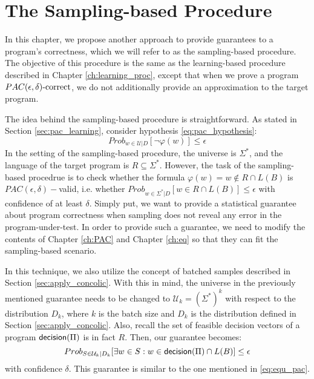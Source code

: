 \chapter{The Sampling-based Procedure}\label{ch:sampling_proc}

In this chapter, we propose another approach to provide guarantees to a program's correctness, which we will refer to as the sampling-based procedure. The objective of this procedure is the same as the learning-based procedure described in Chapter \ref{ch:learning_proc}, except that when we prove a program $PAC(\epsilon, \delta)\text{-correct}$, we do not additionally provide an approximation to the target program. 

The idea behind the sampling-based procedure is straightforward. As stated in Section \ref{sec:pac_learning}, consider hypothesis \ref{eq:pac_hypothesis}:
\begin{equation*}
Prob_{w \in \mathcal{U}|D} [\neg \varphi (w)] \leq \epsilon
\end{equation*}
In the setting of the sampling-based procedure, the universe is $\Sigma^\ast$, and the language of the target program is $R \subseteq \Sigma^\ast$. However, the task of the sampling-based procedrue is to check whether the formula $\varphi(w) = w \notin R \cap L(B)$ is $PAC(\epsilon, \delta)-$valid, i.e. whether $Prob_{w \in \Sigma^\ast | D } [w \in R \cap L(B)] \leq \epsilon$ with confidence of at least $\delta$. Simply put, we want to provide a statistical guarantee about program correctness when sampling does not reveal any error in the program-under-test. In order to provide such a guarantee, we need to modify the contents of Chapter \ref{ch:PAC} and Chapter \ref{ch:eq} so that they can fit the sampling-based scenario.

In this technique, we also utilize the concept of batched samples described in Section \ref{sec:apply_concolic}. With this in mind, the universe in the previously mentioned guarantee needs to be changed to $\mathcal{U}_k = (\Sigma^\ast)^k$ with respect to the distribution $D_k$, where $k$ is the batch size and $D_k$ is the distribution defined in Section \ref{sec:apply_concolic}. Also, recall the set of feasible decision vectors of a program $\mathsf{decision}(\Pi)$ is in fact $R$. Then, our guarantee becomes:
\begin{equation}\label{eq:sampling_guarantee}
Prob_{S \in \mathcal{U}_k | D_k} [\exists w \in S : w \in \mathsf{decision}(\Pi) \cap L(B)] \leq \epsilon
\end{equation} 
with confidence $\delta$. This guarantee is similar to the one mentioned in \ref{eq:equ_pac}. 

